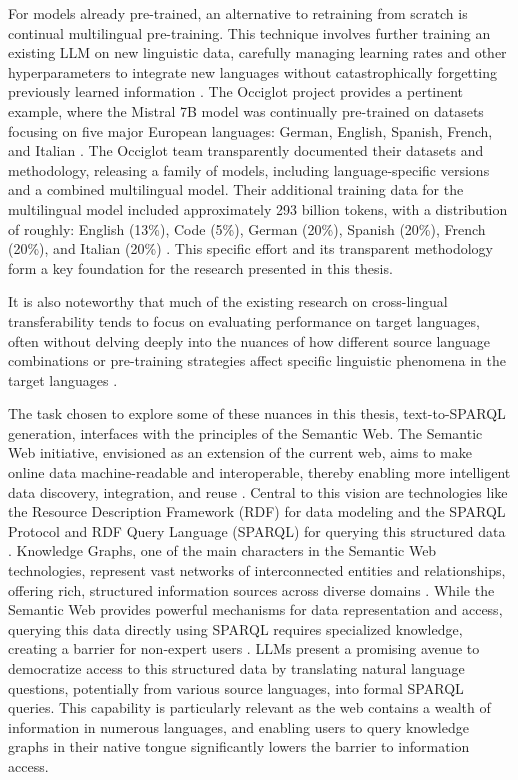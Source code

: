 For models already pre-trained, an alternative to retraining from scratch is continual multilingual pre-training.
This technique involves further training an existing LLM on new linguistic data, carefully managing learning rates and other hyperparameters to integrate new languages without catastrophically forgetting previously learned information \cite{gupta2023continual}.
The Occiglot project provides a pertinent example, where the Mistral 7B model was continually pre-trained on datasets focusing on five major European languages: German, English, Spanish, French, and Italian \cite{avramidis-etal-2024-occiglot}. The Occiglot team transparently documented their datasets and methodology, releasing a family of models, including language-specific versions and a combined multilingual model. Their additional training data for the multilingual model included approximately 293 billion tokens, with a distribution of roughly: English (13\%), Code (5\%), German (20\%), Spanish (20\%), French (20\%), and Italian (20\%) \cite{avramidis-etal-2024-occiglot}. This specific effort and its transparent methodology form a key foundation for the research presented in this thesis.

It is also noteworthy that much of the existing research on cross-lingual transferability tends to focus on evaluating performance on target languages, often without delving deeply into the nuances of how different source language combinations or pre-training strategies affect specific linguistic phenomena in the target languages \cite{singh2024threeprongedapproachcrosslingualadaptation, rathore-etal-2023-zgul, yamaguchi2024effectivelyexpandvocabularyllms}.

The task chosen to explore some of these nuances in this thesis, text-to-SPARQL generation, interfaces with the principles of the Semantic Web.
The Semantic Web initiative, envisioned as an extension of the current web, aims to make online data machine-readable and interoperable, thereby enabling more intelligent data discovery, integration, and reuse \cite{lassila2001semantic, vanharmelen2004semantic}.
Central to this vision are technologies like the Resource Description Framework (RDF) for data modeling and the SPARQL Protocol and RDF Query Language (SPARQL) for querying this structured data \cite{dataeuropa_rdf_sparql}.
Knowledge Graphs, one of the main characters in the Semantic Web technologies, represent vast networks of interconnected entities and relationships, offering rich, structured information sources across diverse domains \cite{hogan2021knowledge}.
While the Semantic Web provides powerful mechanisms for data representation and access, querying this data directly using SPARQL requires specialized knowledge, creating a barrier for non-expert users \cite{KAUFMANN2010377}. 
LLMs present a promising avenue to democratize access to this structured data by translating natural language questions, potentially from various source languages, into formal SPARQL queries. 
This capability is particularly relevant as the web contains a wealth of information in numerous languages, and enabling users to query knowledge graphs in their native tongue significantly lowers the barrier to information access.

